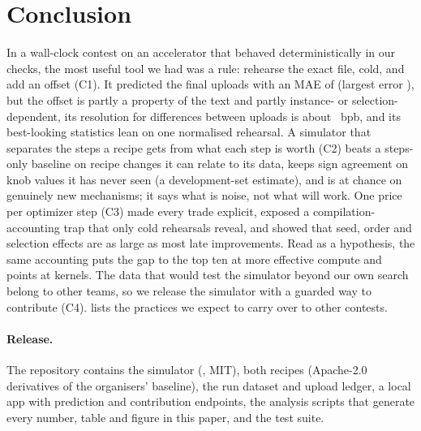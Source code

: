 \section{Conclusion}

In a wall-clock contest on an accelerator that behaved deterministically in our checks, the most useful tool we had
was a rule: rehearse the exact file, cold, and add an offset (C1). It predicted the final uploads with an MAE of
 (largest error ), but the offset is partly a property of the text and partly instance- or
selection-dependent, its resolution for differences between uploads is about ~bpb, and its
best-looking statistics lean on one normalised rehearsal. A simulator that separates the steps a recipe gets from what
each step is worth (C2) beats a steps-only baseline on recipe changes it can relate to its data, keeps
 sign agreement on knob values it has never seen (a development-set estimate), and is at chance
on genuinely new mechanisms; it says what is noise, not what will work. One price per optimizer step (C3) made every trade explicit, exposed a
compilation-accounting trap that only cold rehearsals reveal, and showed that seed, order and selection effects are as large
as most late improvements. Read as a hypothesis, the same accounting puts the gap to the top ten at
 more effective compute and points at kernels. The data that would test the simulator beyond our
own search belong to other teams, so we release the simulator with a guarded way to contribute (C4). 
lists the practices we expect to carry over to other contests.

\paragraph{Release.} The repository contains the simulator (\ffsim{}, MIT), both recipes (Apache-2.0 derivatives of
the organisers' baseline), the run dataset and upload ledger, a local app with prediction and contribution endpoints,
the analysis scripts that generate every number, table and figure in this paper, and the test suite.
